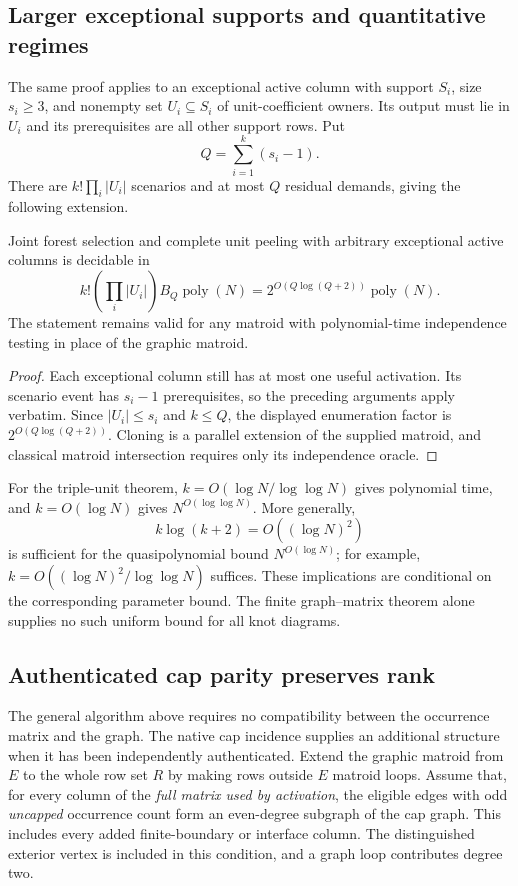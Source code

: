 \subsection{Larger exceptional supports and quantitative regimes}

The same proof applies to an exceptional active column with support
$S_i$, size $s_i\ge3$, and nonempty set $U_i\subseteq S_i$ of
unit-coefficient owners. Its output must lie in $U_i$ and its
prerequisites are all other support rows. Put
\[
                         Q=\sum_{i=1}^k(s_i-1).
\]
There are $k!\prod_i|U_i|$ scenarios and at most $Q$ residual demands,
giving the following extension.

\begin{corollary}
\label{cor:fpt-nonlinear-support}
Joint forest selection and complete unit peeling with arbitrary
exceptional active columns is decidable in
\[
       k!\left(\prod_i|U_i|\right)B_Q\operatorname{poly}(N)
       =2^{O(Q\log(Q+2))}\operatorname{poly}(N).
\]
The statement remains valid for any matroid with polynomial-time
independence testing in place of the graphic matroid.
\end{corollary}
\begin{proof}
Each exceptional column still has at most one useful activation. Its
scenario event has $s_i-1$ prerequisites, so the preceding arguments
apply verbatim. Since $|U_i|\le s_i$ and $k\le Q$, the displayed
enumeration factor is $2^{O(Q\log(Q+2))}$. Cloning is a parallel
extension of the supplied matroid, and classical matroid intersection
requires only its independence oracle.
\end{proof}

For the triple-unit theorem, $k=O(\log N/\log\log N)$ gives polynomial
time, and $k=O(\log N)$ gives $N^{O(\log\log N)}$. More generally,
\[
                k\log(k+2)=O((\log N)^2)
\]
is sufficient for the quasipolynomial bound $N^{O(\log N)}$; for example,
$k=O((\log N)^2/\log\log N)$ suffices. These implications are
conditional on the corresponding parameter bound. The finite
graph--matrix theorem alone supplies no such uniform bound for all
knot diagrams.

\subsection{Authenticated cap parity preserves rank}

The general algorithm above requires no compatibility between the
occurrence matrix and the graph. The native cap incidence supplies an
additional structure when it has been independently authenticated.
Extend the graphic matroid from $E$ to the whole row set $R$ by making
rows outside $E$ matroid loops. Assume that, for every column of the \emph{full matrix used by activation},
the eligible edges with odd \emph{uncapped} occurrence count form an
even-degree subgraph of the cap graph. This includes every added
finite-boundary or interface column. The distinguished exterior vertex
is included in this condition, and a graph loop contributes degree two.

